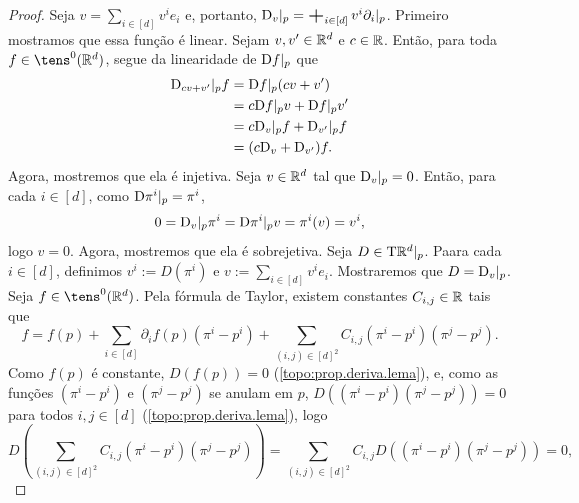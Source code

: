 \begin{proof}
Seja $v = \sum_{i \in [d]} v^ie_i$ e, portanto, $\D_v|_p = \sum_{i \in [d]} v^i \partial_i|_p$. Primeiro mostramos que essa função é linear. Sejam $v,v' \in \mathbb{R}^d$ e $c \in \mathbb{R}$. Então, para toda $f \in \tens^0(\R^d)$, segue da linearidade de $\mathrm{D} f|_p$ que
	\begin{align*}
	\mathrm{D}_{cv+v'}|_p f &= \mathrm{D} f|_p (cv+v') \\
		&= c\mathrm{D} f|_p v + \mathrm{D} f|_p v' \\
		&= c\mathrm{D}_v|_p f + \mathrm{D}_{v'}|_p f \\
		&= (c\mathrm{D}_v+\mathrm{D}_{v'})f.
	\end{align*}
Agora, mostremos que ela é injetiva. Seja $v \in \mathbb{R}^d$ tal que $\mathrm{D}_v|_p = 0$. Então, para cada $i \in [d]$, como $\mathrm{D} \pi^i|_p = \pi^i$,
	\begin{equation*}
	0 = \mathrm{D}_v|_p \pi^i = \mathrm{D} \pi^i|_p v = \pi^i(v) = v^i,
	\end{equation*}
logo $v=0$. Agora, mostremos que ela é sobrejetiva. Seja $D \in \mathrm{T} \mathbb{R}^d|_p$. Paara cada $i \in [d]$, definimos $v^i := D(\pi^i)$ e $v := \sum_{i \in [d]} v^ie_i$. Mostraremos que $D = \mathrm{D}_v|_p$. Seja $f \in \tens^0(\R^d)$. Pela fórmula de Taylor, existem constantes $C_{i,j} \in \mathbb{R}$ tais que
	\begin{equation*}
	f = f(p) + \sum_{i \in [d]} \partial_i f(p) (\pi^i-p^i) + \sum_{(i,j) \in [d]^2} C_{i,j}(\pi^i-p^i)(\pi^j-p^j).
	\end{equation*}
Como $f(p)$ é constante, $D(f(p))=0$ (\ref{topo:prop.deriva.lema}), e, como as funções $(\pi^i-p^i)$ e $(\pi^j-p^j)$ se anulam em $p$, $D\left( (\pi^i-p^i)(\pi^j-p^j)\right) = 0$ para todos $i,j \in [d]$ (\ref{topo:prop.deriva.lema}), logo
	\begin{equation*}
	D\left( \sum_{(i,j) \in [d]^2} C_{i,j}(\pi^i-p^i)(\pi^j-p^j)\right) = \sum_{(i,j) \in [d]^2} C_{i,j}D\left( (\pi^i-p^i)(\pi^j-p^j)\right) = 0,

\end{equation*}
\end{proof}
